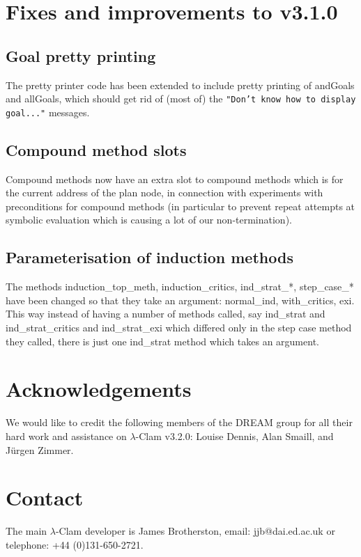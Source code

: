 \documentclass[11pt]{article}
\begin{document}
\section{Fixes and improvements to v3.1.0}
\subsection{Goal pretty printing}
The pretty printer code has been extended to include pretty printing
of andGoals and allGoals, which should get rid of (most of) the
\texttt{"Don't know how to display goal..."} messages.

\subsection{Compound method slots}
Compound methods now have an extra slot to compound methods which is
for the current address of the plan node, in connection with experiments
with preconditions for compound methods (in particular to prevent
repeat attempts at symbolic evaluation which is causing a lot of our
non-termination). 

\subsection{Parameterisation of induction methods}
The methods induction\_top\_meth, induction\_critics, ind\_strat\_*,
step\_case\_* have been changed so that they take an argument:
normal\_ind, with\_critics, exi.  This way instead of having a number
of methods called, say ind\_strat and ind\_strat\_critics and
ind\_strat\_exi which differed only in the step case method they
called, there is just one ind\_strat method which takes an argument.

\section{Acknowledgements}
We would like to credit the following members of the DREAM group for
all their hard work and assistance on $\lambda$-Clam v3.2.0: Louise
Dennis, Alan Smaill, and J\"urgen Zimmer.

\section{Contact}
The main $\lambda$-Clam developer is James Brotherston, email:
jjb@dai.ed.ac.uk or telephone: +44 (0)131-650-2721.
\end{document}
